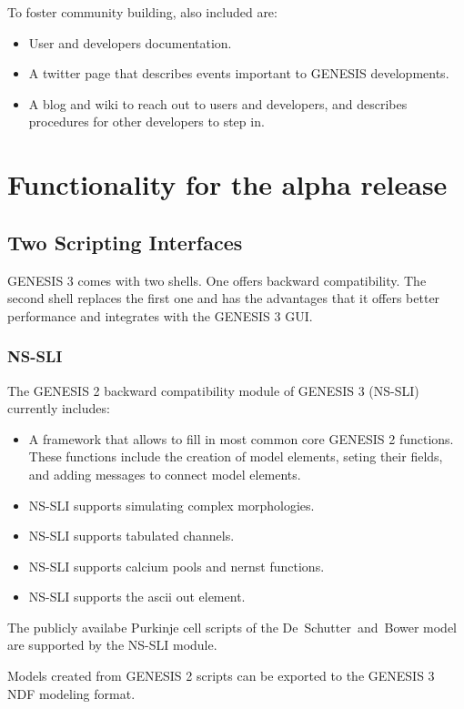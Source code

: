 \documentclass[12pt]{article}
\begin{document}
To foster community building, also included are:
\begin{itemize}
\item User and developers documentation.
\item A twitter page that describes events important to GENESIS
  developments.
\item A blog and wiki to reach out to users and developers, and
  describes procedures for other developers to step in.
\end{itemize}


\section{Functionality for the alpha release}

\subsection{Two Scripting Interfaces}

GENESIS 3 comes with two shells.  One offers backward compatibility.
The second shell replaces the first one and has the advantages that it
offers better performance and integrates with the GENESIS 3 GUI.

\subsubsection{NS-SLI}
The GENESIS 2 backward compatibility module of GENESIS 3 (NS-SLI)
currently includes:
\begin{itemize}
\item A framework that allows to fill in most common core GENESIS 2
  functions.  These functions include the creation of model elements,
  seting their fields, and adding messages to connect model elements.
\item NS-SLI supports simulating complex morphologies.
\item NS-SLI supports tabulated channels.
\item NS-SLI supports calcium pools and nernst functions.
\item NS-SLI supports the ascii out element.
\end{itemize}

The publicly availabe Purkinje cell scripts of the
De~Schutter~and~Bower model are supported by the NS-SLI module.

Models created from GENESIS 2 scripts can be exported to the GENESIS 3
NDF modeling format.
\end{document}
